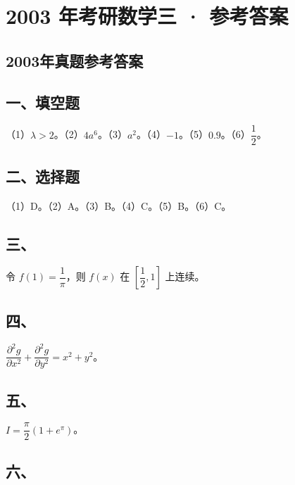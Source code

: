 \documentclass[UTF8,12pt]{ctexart}
\begin{document}
\section*{2003 年考研数学三 · 参考答案}
\subsection*{2003年真题参考答案}

\subsection*{一、填空题}

（1）\(\displaystyle \lambda>2\)。（2）\(\displaystyle 4a^6\)。（3）\(\displaystyle a^2\)。（4）\(\displaystyle -1\)。（5）\(\displaystyle 0.9\)。（6）\(\displaystyle \dfrac{\displaystyle 1}{\displaystyle 2}\)。


\subsection*{二、选择题}

（1）D。（2）A。（3）B。（4）C。（5）B。（6）C。


\subsection*{三、}

令 \(\displaystyle f(1)=\dfrac{\displaystyle 1}{\displaystyle \pi}\)，则 \(\displaystyle f(x)\) 在 \(\displaystyle [\dfrac{\displaystyle 1}{\displaystyle 2},\allowbreak 1]\) 上连续。


\subsection*{四、}

\(\displaystyle \dfrac{\displaystyle \partial^2g}{\displaystyle \partial x^2}+\dfrac{\displaystyle \partial^2g}{\displaystyle \partial y^2}=x^2+y^2\)。


\subsection*{五、}

\(\displaystyle I=\dfrac{\displaystyle \pi}{\displaystyle 2}(1+e^\pi)\)。


\subsection*{六、}
\end{document}
